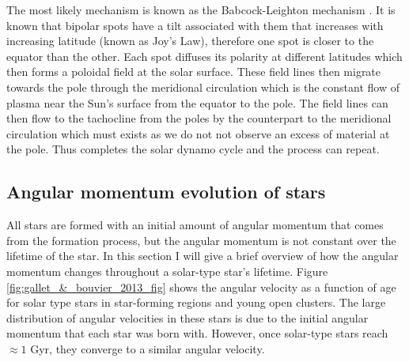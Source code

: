 The most likely mechanism is known as the Babcock-Leighton mechanism \citep{Babcock_1961,Leighton_1969}. It is known that bipolar spots have a tilt associated with them that increases with increasing latitude (known as Joy's Law), therefore one spot is closer to the equator than the other. Each spot diffuses its polarity at different latitudes which then forms a poloidal field at the solar surface. These field lines then migrate towards the pole through the meridional circulation which is the constant flow of plasma near the Sun's surface from the equator to the pole. The field lines can then flow to the tachocline from the poles by the counterpart to the meridional circulation which must exists as we do not not observe an excess of material at the pole. Thus completes the solar dynamo cycle and the process can repeat.

\subsection{Angular momentum evolution of stars}

All stars are formed with an initial amount of angular momentum that comes from the formation process, but the angular momentum is not constant over the lifetime of the star. In this section I will give a brief overview of how the angular momentum changes throughout a solar-type star's lifetime. Figure \ref{fig:gallet_&_bouvier_2013_fig} shows the angular velocity as a function of age for solar type stars in star-forming regions and young open clusters. The large distribution of angular velocities in these stars is due to the initial angular momentum that each star was born with. However, once solar-type stars reach $\approx 1$ Gyr, they converge to a similar angular velocity.

